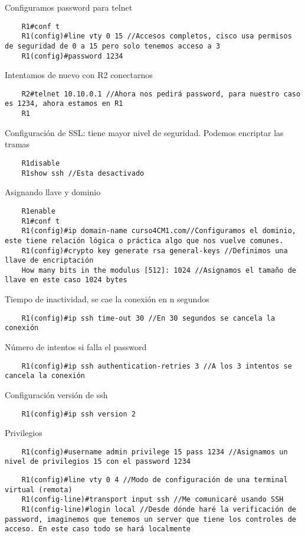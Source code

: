 Configuramos password para telnet
\begin{lstlisting}
    R1#conf t
    R1(config)#line vty 0 15 //Accesos completos, cisco usa permisos de seguridad de 0 a 15 pero solo tenemos acceso a 3 
    R1(config)#password 1234
\end{lstlisting}

Intentamos de nuevo con R2 conectarnos
\begin{lstlisting}
    R2#telnet 10.10.0.1 //Ahora nos pedirá password, para nuestro caso es 1234, ahora estamos en R1
    R1
\end{lstlisting}

Configuración de SSL: tiene mayor nivel de seguridad. Podemos encriptar las tramas
\begin{lstlisting}
    R1disable
    R1show ssh //Esta desactivado
\end{lstlisting}

Asignando llave y dominio 
\begin{lstlisting}
    R1enable
    R1#conf t
    R1(config)#ip domain-name curso4CM1.com//Configuramos el dominio, este tiene relación lógica o práctica algo que nos vuelve comunes.
    R1(config)#crypto key generate rsa general-keys //Definimos una llave de encriptación
    How many bits in the modulus [512]: 1024 //Asignamos el tamaño de llave en este caso 1024 bytes
\end{lstlisting}

Tiempo de inactividad, se cae la conexión en n segundos 
\begin{lstlisting}
    R1(config)#ip ssh time-out 30 //En 30 segundos se cancela la conexión
\end{lstlisting}

Número de intentos si falla el password 
\begin{lstlisting}
    R1(config)#ip ssh authentication-retries 3 //A los 3 intentos se cancela la conexión 
\end{lstlisting}

Configuración versión de ssh 
\begin{lstlisting}
    R1(config)#ip ssh version 2
\end{lstlisting}

Privilegios 
\begin{lstlisting}
    R1(config)#username admin privilege 15 pass 1234 //Asignamos un nivel de privilegios 15 con el password 1234
\end{lstlisting}

\begin{lstlisting}
    R1(config)#line vty 0 4 //Modo de configuración de una terminal virtual (remota)
    R1(config-line)#transport input ssh //Me comunicaré usando SSH
    R1(config-line)#login local //Desde dónde haré la verificación de password, imaginemos que tenemos un server que tiene los controles de acceso. En este caso todo se hará localmente
\end{lstlisting}

